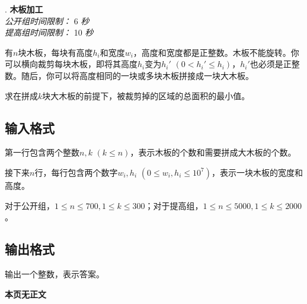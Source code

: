 \addtocounter{ProblemNo}{1}
\renewcommand{\ProblemName}{木板加工}
\begin{center}
\huge{. \textbf{\ProblemName}} \\ [0.8cm]
\large{\textit{公开组时间限制：} 6 \textit{秒}} \\ 
\large{\textit{提高组时间限制：} 10 \textit{秒}} \\ [1cm]
\end{center}

有$n$块木板，每块有高度$h_i$和宽度$w_i$，高度和宽度都是正整数。木板不能旋转。你可以横向裁剪每块木板，即将其高度$h_i$变为$h_i'$ $(0 < h_i' \leq h_i)$，$h_i'$也必须是正整数。随后，你可以将高度相同的一块或多块木板拼接成一块大木板。

求在拼成$k$块大木板的前提下，被裁剪掉的区域的总面积的最小值。

\subsection*{输入格式}

第一行包含两个整数$n, k$ $(k \leq n)$，表示木板的个数和需要拼成大木板的个数。

接下来$n$行，每行包含两个数字$w_i, h_i$ $(0 \leq w_i, h_i \leq 10^7)$，表示一块木板的宽度和高度。

对于公开组，$1 \leq n \leq 700, 1 \leq k \leq 300$；对于提高组，$1 \leq n \leq 5000, 1 \leq k \leq 2000$。

\subsection*{输出格式}

输出一个整数，表示答案。

\setcounter{ExampleNo}{0}


\clearpage

\ifodd\value{page}
\else
    \vspace*{\fill}
    \begin{center}
    \textbf{\Large 本页无正文}
    \end{center}
    \vspace*{\fill}
    \clearpage
\fi

